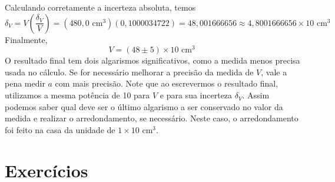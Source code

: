 Calculando corretamente a incerteza absoluta, temos
\[
\delta_V=  V\left(\frac{\delta_V}{  V}\right)= (480,\!0\mbox{ cm}^3)( 0,\!1000034722) = 48,001666656 \approx 4,8001666656 \times 10  \mbox{ cm}^3
\]
Finalmente,
\[
V = (48\pm 5) \times 10 \mbox{ cm}^3\;
\]
O resultado final tem dois algarismos significativos, como a medida menos precisa usada no cálculo. Se for necessário melhorar a precisão da medida de $V$, vale a pena medir $a$ com mais precisão. Note que ao escrevermos o resultado final, utilizamos a mesma potência de 10 para $V$ e para sua incerteza $\delta_V$. Assim podemos saber qual deve ser o último algarismo a ser conservado no valor da medida e realizar o arredondamento, se necessário. Neste caso, o arredondamento foi feito na casa da unidade de $1\times 10 \mbox{ cm}^3$.
%

\section*{Exercícios}


